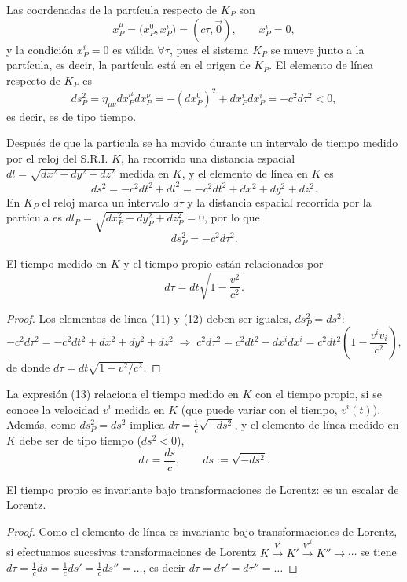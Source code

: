 Las coordenadas de la partícula respecto de $K_P$ son
\[
x^\mu_P = \big(x^0_P,x^i_P\big) = (c\tau,\vec 0), \qquad x^i_P=0, \tag{10}
\]
y la condición $x^i_P=0$ es válida $\forall\tau$, pues el sistema $K_P$
se mueve junto a la partícula, es decir, la partícula está en el origen
de $K_P$. El elemento de línea respecto de $K_P$ es
\[
ds_P^2 = \eta_{\mu\nu}dx^\mu_Pdx^\nu_P = -(dx_P^0)^2+dx^i_Pdx^i_P =
-c^2d\tau^2<0,
\]
es decir, es de tipo tiempo.

Después de que la partícula se ha movido durante un intervalo de tiempo
medido por el reloj del S.R.I. $K$, ha recorrido una distancia espacial
$dl=\sqrt{dx^2+dy^2+dz^2}$ medida en $K$, y el elemento de línea en $K$
es
\[
ds^2 = -c^2dt^2+dl^2 = -c^2dt^2+dx^2+dy^2+dz^2. \tag{11}
\]
En $K_P$ el reloj marca un intervalo $d\tau$ y la distancia espacial
recorrida por la partícula es $dl_P=\sqrt{dx_P^2+dy_P^2+dz_P^2}=0$, por
lo que
\[
ds_P^2 = -c^2d\tau^2 . \tag{12}
\]

\begin{proposicionc}
El tiempo medido en $K$ y el tiempo propio están relacionados por
\[
d\tau = dt\sqrt{1-\frac{v^2}{c^2}} . \tag{13}
\]
\end{proposicionc}

\begin{proof}
Los elementos de línea (11) y (12) deben ser iguales, $ds_P^2=ds^2$:
\[
-c^2d\tau^2 = -c^2dt^2+dx^2+dy^2+dz^2 \;\Rightarrow\;
c^2d\tau^2 = c^2dt^2-dx^idx^i = c^2dt^2\left(1-\frac{v^iv_i}{c^2}\right),
\]
de donde $d\tau=dt\sqrt{1-v^2/c^2}$. \qedhere
\end{proof}

La expresión (13) relaciona el tiempo medido en $K$ con el tiempo
propio, si se conoce la velocidad $v^i$ medida en $K$ (que puede variar
con el tiempo, $v^i(t)$). Además, como $ds_P^2=ds^2$ implica
$d\tau=\frac1c\sqrt{-ds^2}$, y el elemento de línea medido en $K$ debe
ser de tipo tiempo ($ds^2<0$),
\[
d\tau = \frac{ds}{c}, \qquad ds:=\sqrt{-ds^2}. \tag{14}
\]

\begin{proposicionc}
El tiempo propio es invariante bajo transformaciones de Lorentz: es un
escalar de Lorentz.
\end{proposicionc}

\begin{proof}
Como el elemento de línea es invariante bajo transformaciones de
Lorentz, si efectuamos sucesivas transformaciones de Lorentz $K
\xrightarrow{V^i}K'\xrightarrow{V'^i}K''\to\cdots$ se tiene
$d\tau=\frac1cds=\frac1cds'=\frac1cds''=\dots$, es decir
$d\tau=d\tau'=d\tau''=\dots$ \qedhere
\end{proof}

